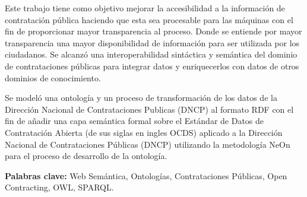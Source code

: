 \begin{resumen}



Este trabajo tiene como objetivo mejorar la accesibilidad a la información de contratación pública haciendo que esta sea procesable para las máquinas con el fin de proporcionar mayor transparencia al proceso. Donde se entiende por mayor transparencia una mayor disponibilidad de información para ser utilizada por los ciudadanos. Se alcanzó una interoperabilidad sintáctica y semántica del dominio de contrataciones públicas para integrar datos y enriquecerlos con datos de otros dominios de conocimiento. 

Se modeló una ontología y un proceso de transformación de los datos de la Dirección Nacional de Contrataciones Publicas (DNCP) al formato RDF con el fin de añadir una capa semántica formal sobre el Estándar de Datos de Contratación Abierta (de sus siglas en ingles OCDS) aplicado a la Dirección Nacional de Contrataciones Públicas (DNCP) utilizando la metodología NeOn para el proceso de desarrollo de la ontología.
    
\textbf{Palabras clave:} Web Semántica,  Ontologías, Contrataciones Públicas, Open Contracting, OWL, SPARQL.
\end{resumen}


